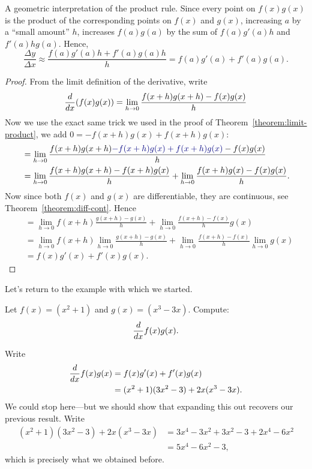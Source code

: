 \begin{marginfigure}
\caption{A geometric interpretation of the product rule. Since every
  point on $f(x)g(x)$ is the product of the corresponding points on
  $f(x)$ and $g(x)$, increasing $a$ by a ``small amount'' $h$,
  increases $f(a)g(a)$ by the sum of $f(a)g'(a)h$ and
  $f'(a)hg(a)$. Hence,
\[
\frac{\Delta y}{\Delta x}\approx \frac{f(a)g'(a)h+f'(a)g(a)h}{h} = f(a)g'(a) + f'(a)g(a).
\]}
\end{marginfigure}

\begin{proof}
From the limit definition of the derivative, write
\[
\frac{d}{dx} (f(x)g(x)) = \lim_{h \to0} \frac{f(x+h)g(x+h) - f(x)g(x)}{h}
\]
Now we use the exact same trick we used in the proof of
Theorem~\ref{theorem:limit-product}, we add $0 = -f(x+h)g(x) + f(x+h)g(x)$:
\begin{align*}
&=\lim_{h \to0} \frac{f(x+h)g(x+h){\color{penColor2}-f(x+h)g(x) + f(x+h)g(x)}- f(x)g(x)}{h} \\ 
&=\lim_{h \to0} \frac{f(x+h)g(x+h)-f(x+h)g(x)}{h} + \lim_{h \to0} \frac{f(x+h)g(x)- f(x)g(x)}{h}.
\end{align*}
Now since both $f(x)$ and $g(x)$ are differentiable, they are
continuous, see Theorem~\ref{theorem:diff-cont}. Hence
\begin{align*}
&=\lim_{h \to0} f(x+h)\frac{g(x+h)-g(x)}{h} + \lim_{h \to0} \frac{f(x+h)- f(x)}{h}g(x) \\ 
&=\lim_{h \to0} f(x+h)\lim_{h \to0}\frac{g(x+h)-g(x)}{h} + \lim_{h \to0} \frac{f(x+h)- f(x)}{h}\lim_{h \to0}g(x) \\ 
&=f(x)g'(x) + f'(x)g(x).
\end{align*}
\end{proof}



Let's return to the example with which we started.
\begin{example} 
Let $f(x)=(x^2+1)$ and $g(x)=(x^3-3x)$. Compute:
\[
\frac{d}{dx} f(x)g(x).
\]
\end{example}
\begin{solution}
Write
\begin{align*}
\frac{d}{dx} f(x)g(x) &= f(x)g'(x) + f'(x)g(x)\\
&=(x^2+1)(3x^2-3) + 2x(x^3-3x).
\end{align*}
We could stop here---but we should show that expanding this out recovers our previous result. Write
\begin{align*}
(x^2+1)(3x^2-3) + 2x(x^3-3x) &= 3x^4-3x^2 +3x^2 -3 + 2x^4-6x^2\\
&=5x^4-6x^2-3,
\end{align*}
which is precisely what we obtained before.
\end{solution}




